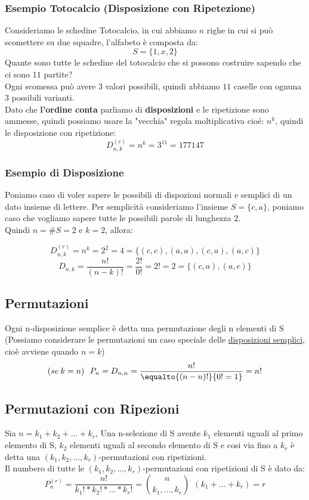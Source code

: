 \subsubsection{Esempio Totocalcio (Disposizione con Ripetezione)}
Consideriamo le schedine Totocalcio, in cui abbiamo $n$ righe in cui si può scomettere su due squadre, l'alfabeto è composta da:
$$ S =\{1,x,2\} $$
Quante sono tutte le schedine del totocalcio che si possono costruire sapendo che ci sono $11$ partite?\\
Ogni scomessa può avere $3$ valori possibili, quindi abbiamo $11$ caselle con ognuna $3$ possibili varianti.\\
Dato che \textbf{l'ordine conta} parliamo di \textbf{disposizioni} e le ripetizione sono ammesse, quindi possiamo usare la "vecchia" regola moltiplicativa cioé: $n^k$, quindi le disposizione con ripetizione:\\
$$ D^{(r)}_{n,k} = n^k = 3^11 = 177147$$ 

\subsubsection{Esempio di Disposizione}
Poniamo caso di voler sapere le possibili di dispozioni normali e semplici di un dato insieme di lettere.
Per semplicità consideriamo l'insieme $S=\{c,a\}$, poniamo caso che vogliamo sapere tutte le possibili parole di lunghezza $2$.\\
Quindi $n = \#S = 2$ e $k = 2$, allora:

$$ D^{(r)}_{n,k} = n^k = 2^2 = 4 = \{(c,c),(a,a),(c,a),(a,c)\} $$
$$ D_{n,k} = \frac{n!}{(n-k)!} = \frac{2!}{0!} = 2! = 2 = \{(c,a), (a,c)\}$$ 

\subsection{Permutazioni}
Ogni n-disposizione semplice è detta una permutazione degli n elementi di S\\
(Possiamo considerare le permutazioni un caso speciale delle 
\hyperref[sec:disposizioni]{disposizioni semplici}, cioè avviene quando $n=k$)
$$ (se \: k=n) \: \: \: P_n = D_{n,n} = \frac{n!}{\equalto{(n-n)!}{0!=1}} = n!  $$

\subsection{Permutazioni con Ripezioni}
Sia $n=k_1+k_2+...+k_r$, Una n-selezione di S avente $k_1$ elementi uguali al primo elemento di S, $k_2$ elementi uguali al secondo elemento di S e cosi via fino a $k_r$ è detta una $(k_1,k_2,...,k_r)$-permutazioni con ripetizioni.\\
Il numbero di tutte le $(k_1,k_2,...,k_r)$-permutazioni con ripetizioni di S è dato da:
$$ P^{(r)}_n = \frac{n!}{k_1! * k_2! * ... * k_r!} = \binom{n}{k_1,...,k_r} \: \: (k_1+...+k_r)=r$$

